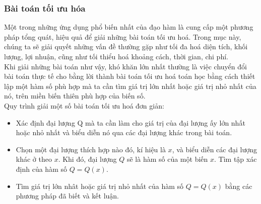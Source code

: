 \subsubsection{Bài toán tối ưu hóa}
Một trong những ứng dụng phổ biến nhất của đạo hàm là cung cấp một phương pháp tổng quát, hiệu quả để giải những bài toán tối ưu hoá. Trong mục này, chúng ta sẽ giải quyết những vấn đề thường gặp như tối đa hoá diện tích, khối lượng, lợi nhuận, cũng như tối thiểu hoá khoảng cách, thời gian, chi phí.\\
Khi giải những bài toán như vậy, khó khăn lớn nhất thường là việc chuyển đổi bài toán thực tế cho bằng lời thành bài toán tối ưu hoá toán học bằng cách thiết lập một hàm số phù hợp mà ta cần tìm giá trị lớn nhất hoặc giá trị nhỏ nhất của nó, trên miền biến thiên phù hợp của biến số.\\
Quy trình giải một số bài toán tối ưu hoá  đơn giản:
\begin{itemize}
	\item[\iconCH] Xác định đại lượng Q mà ta cần làm cho giá trị của đại lượng ấy lớn nhất hoặc nhỏ nhất và biểu diễn nó qua các đại lượng khác trong bài toán.
	
	\item[\iconCH]  Chọn một đại lượng thích hợp nào đó, kí hiệu là $x$, và biểu diễn các đại lượng khác ở  theo $x$. Khi đó, đại lượng $Q$ sẽ là hàm số của một biến $x$. Tìm tập xác định của hàm số $Q=Q(x)$.
	
	\item[\iconCH]  Tìm giá trị lớn nhât hoặc giá trị nhỏ nhất của hàm số $Q=Q(x)$ bằng các phương pháp đã biết và kết luận.
\end{itemize}

